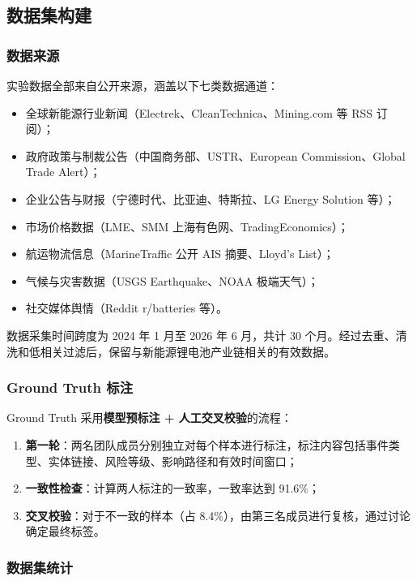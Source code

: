 \documentclass[12pt,a4paper]{article}
\newcommand{\term}[1]{\textbf{#1}}
\begin{document}
\subsection{数据集构建}
\label{sec:exp-dataset}

\subsubsection{数据来源}

实验数据全部来自公开来源，涵盖以下七类数据通道：
\begin{itemize}
    \item 全球新能源行业新闻（Electrek、CleanTechnica、Mining.com 等 RSS 订阅）；
    \item 政府政策与制裁公告（中国商务部、USTR、European Commission、Global Trade Alert）；
    \item 企业公告与财报（宁德时代、比亚迪、特斯拉、LG Energy Solution 等）；
    \item 市场价格数据（LME、SMM 上海有色网、TradingEconomics）；
    \item 航运物流信息（MarineTraffic 公开 AIS 摘要、Lloyd's List）；
    \item 气候与灾害数据（USGS Earthquake、NOAA 极端天气）；
    \item 社交媒体舆情（Reddit r/batteries 等）。
\end{itemize}

数据采集时间跨度为 2024 年 1 月至 2026 年 6 月，共计 30 个月。经过去重、清洗和低相关过滤后，保留与新能源锂电池产业链相关的有效数据。

\subsubsection{Ground Truth 标注}

Ground Truth 采用\textbf{模型预标注 + 人工交叉校验}的流程：
\begin{enumerate}
    \item \term{第一轮}：两名团队成员分别独立对每个样本进行标注，标注内容包括事件类型、实体链接、风险等级、影响路径和有效时间窗口；
    \item \term{一致性检查}：计算两人标注的一致率，一致率达到 91.6\%；
    \item \term{交叉校验}：对于不一致的样本（占 8.4\%），由第三名成员进行复核，通过讨论确定最终标签。
\end{enumerate}

\subsubsection{数据集统计}
\end{document}
